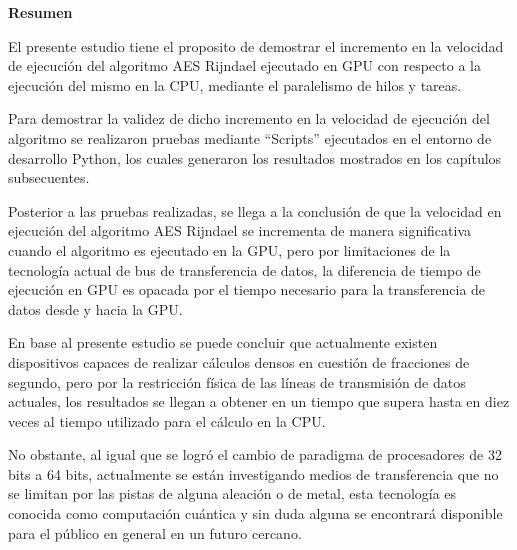 \documentclass[../main/main.tex]{subfiles}
\begin{document}
  \begin{center}
    \textbf{\large Resumen}
  \end{center}

  El presente estudio tiene el proposito de demostrar el incremento en la velocidad de ejecución del algoritmo AES Rijndael ejecutado en GPU con respecto a la ejecución del mismo en la CPU, mediante el paralelismo de hilos y tareas.

  Para demostrar la validez de dicho incremento en la velocidad de ejecución del algoritmo se realizaron pruebas mediante ``Scripts'' ejecutados en el entorno de desarrollo Python, los cuales generaron los resultados mostrados en los capítulos subsecuentes.

  Posterior a las pruebas realizadas, se llega a la conclusión de que la velocidad en ejecución del algoritmo AES Rijndael se incrementa de manera significativa cuando el algoritmo es ejecutado en la GPU, pero por limitaciones de la tecnología actual de bus de transferencia de datos, la diferencia de tiempo de ejecución en GPU es opacada por el tiempo necesario para la transferencia de datos desde y hacia la GPU.

  En base al presente estudio se puede concluir que actualmente existen dispositivos capaces de realizar cálculos densos en cuestión de fracciones de segundo, pero por la restricción física de las líneas de transmisión de datos actuales, los resultados se llegan a obtener en un tiempo que supera hasta en diez veces al tiempo utilizado para el cálculo en la CPU.

  No obstante, al igual que se logró el cambio de paradigma de procesadores de 32 bits a 64 bits, actualmente se están investigando medios de transferencia que no se limitan por las pistas de alguna aleación o de metal, esta tecnología es conocida como computación cuántica y sin duda alguna se encontrará disponible para el público en general en un futuro cercano.
\end{document}
